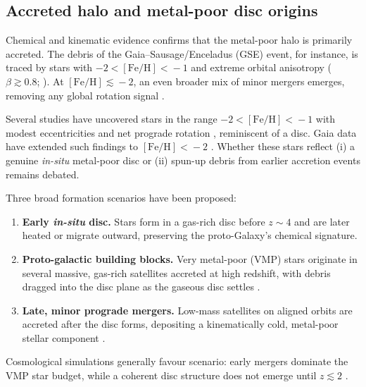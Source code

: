 \documentclass[a4paper,12pt]{article}
\begin{document}
\subsection{Accreted halo and metal-poor disc origins}
\label{subsec:halo_disc_origins}

Chemical and kinematic evidence confirms that the metal-poor halo is primarily accreted.  
The debris of the Gaia–Sausage/Enceladus (GSE) event, for instance, is traced by stars with 
$-2\!<\![\mathrm{Fe/H}]\!<\!-1$ and extreme orbital anisotropy ($\beta\!\gtrsim\!0.8$; 
\citealt{Belokurov2018,Helmi2018}). At $[\mathrm{Fe/H}]\!\lesssim\!-2$, an even broader mix 
of minor mergers emerges, removing any global rotation signal \citep{Lancaster2019,Bird2021}.  

Several studies have uncovered stars in the range 
$-2\!<\![\mathrm{Fe/H}]\!<\!-1$ with modest eccentricities and net prograde rotation 
\citep{Norris1985,Chiba2000,Carollo2019,An2020}, reminiscent of a disc.  
Gaia data have extended such findings to $[\mathrm{Fe/H}]\!<\!-2$  
\citep{Sestito2019,Venn2020,Cordoni2020,Mardini2022}.  
Whether these stars reflect (i) a genuine {\it in-situ} metal-poor disc or (ii) spun-up 
debris from earlier accretion events remains debated.

Three broad formation scenarios have been proposed:
\begin{enumerate}
    \item \textbf{Early {\it in-situ} disc.}  
          Stars form in a gas-rich disc before $z\!\sim\!4$ and are later heated or migrate outward, 
          preserving the proto-Galaxy’s chemical signature. 
    \item \textbf{Proto-galactic building blocks.}  
          Very metal-poor (VMP) stars originate in several massive, gas-rich satellites accreted at high redshift, 
          with debris dragged into the disc plane as the gaseous disc settles \citep[e.g.][]{Sestito2020}. 
    \item \textbf{Late, minor prograde mergers.}  
          Low-mass satellites on aligned orbits are accreted after the disc forms, 
          depositing a kinematically cold, metal-poor stellar component \citep{Santistevan2021}.
\end{enumerate}

Cosmological simulations generally favour scenario: early mergers dominate the VMP star budget, 
while a coherent disc structure does not emerge until $z\!\lesssim\!2$ \citep{Gurvich2023}.
 
\end{document}
